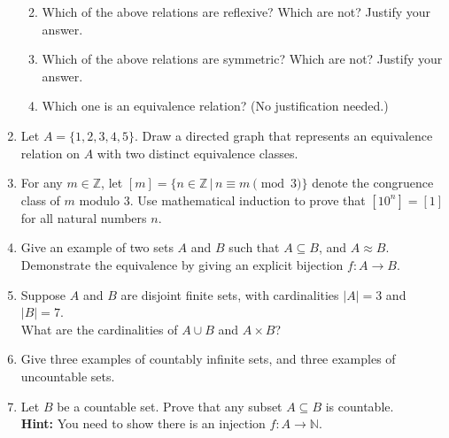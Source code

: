 \documentclass[12pt]{article}
\newcommand{\points}[1]{\marginpar{\hspace{24pt}[#1]}}
\begin{document}
\begin{enumerate}
\begin{enumerate}
\vspace{2in}

 \item Which of the above relations are reflexive? Which are not? Justify your answer.\points{3}

\vspace{2in}

 \item Which of the above relations are symmetric? Which are not? Justify your answer. \points{3}

\vspace{2in}

 \item Which one is an equivalence relation? (No justification needed.) \points{1}
\end{enumerate}
\newpage

 \item Let $A = \{1,2,3,4,5\}$. Draw a directed graph that represents an equivalence relation on $A$ with two distinct equivalence classes.\points{4}

\vspace{3in}

 \item  For any $m\in\mathbb{Z}$, let $[m]=\{n\in\mathbb{Z} \,|\, n\equiv m\pmod{3}\}$ denote the congruence class of $m$ modulo 3. Use mathematical induction to prove that $[10^n]=[1]$ for all natural numbers $n$.\points{6}
 
\newpage

\item Give an example of two sets $A$ and $B$ such that $A\subseteq B$, and $A\approx B$.\points{4}\\
Demonstrate the equivalence by giving an explicit bijection $f:A\to B$.

\vspace{3in}

\item Suppose $A$ and $B$ are disjoint finite sets, with cardinalities $|A|=3$ and $|B|=7$. \\
What are the cardinalities of $A\cup B$ and $A\times B$? \points{3}

\vspace{3in}

\item Give three examples of countably infinite sets, and three examples of uncountable sets.\points{3}

\newpage

\item Let $B$ be a countable set. Prove that any subset $A\subseteq B$ is countable. \points{4}\\
{\bf Hint:} You need to show there is an injection $f:A\to\mathbb{N}$.


\end{enumerate}
\end{document}
